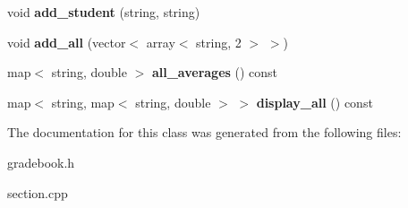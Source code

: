\begin{DoxyCompactItemize}
\item 
void {\bfseries add\+\_\+student} (string, string)\hypertarget{classsection_a4fb835654a0cc610c922b35be68a91ee}{}\label{classsection_a4fb835654a0cc610c922b35be68a91ee}

\item 
void {\bfseries add\+\_\+all} (vector$<$ array$<$ string, 2 $>$ $>$)\hypertarget{classsection_ad89afc2016b4516cbd4c8a5006f95bd0}{}\label{classsection_ad89afc2016b4516cbd4c8a5006f95bd0}

\item 
map$<$ string, double $>$ {\bfseries all\+\_\+averages} () const \hypertarget{classsection_a731fb0f1edfd19d29968ae98322d8af1}{}\label{classsection_a731fb0f1edfd19d29968ae98322d8af1}

\item 
map$<$ string, map$<$ string, double $>$ $>$ {\bfseries display\+\_\+all} () const \hypertarget{classsection_a3de3ebbf8401fa36ff3113093349f158}{}\label{classsection_a3de3ebbf8401fa36ff3113093349f158}

\end{DoxyCompactItemize}


The documentation for this class was generated from the following files\+:\begin{DoxyCompactItemize}
\item 
gradebook.\+h\item 
section.\+cpp\end{DoxyCompactItemize}
